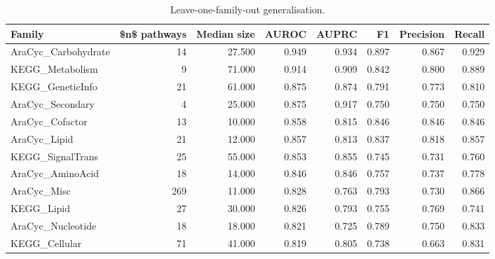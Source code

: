 \begin{table}[htbp]
\centering
\caption{Leave-one-family-out generalisation.}
\label{tab:lofo_recomputed}
\begin{tabular}{lrrrrrrr}
\toprule
Family & \$n\$ pathways & Median size & AUROC & AUPRC & F1 & Precision & Recall \\
\midrule
AraCyc\_Carbohydrate & 14 & 27.500 & 0.949 & 0.934 & 0.897 & 0.867 & 0.929 \\
KEGG\_Metabolism & 9 & 71.000 & 0.914 & 0.909 & 0.842 & 0.800 & 0.889 \\
KEGG\_GeneticInfo & 21 & 61.000 & 0.875 & 0.874 & 0.791 & 0.773 & 0.810 \\
AraCyc\_Secondary & 4 & 25.000 & 0.875 & 0.917 & 0.750 & 0.750 & 0.750 \\
AraCyc\_Cofactor & 13 & 10.000 & 0.858 & 0.815 & 0.846 & 0.846 & 0.846 \\
AraCyc\_Lipid & 21 & 12.000 & 0.857 & 0.813 & 0.837 & 0.818 & 0.857 \\
KEGG\_SignalTrans & 25 & 55.000 & 0.853 & 0.855 & 0.745 & 0.731 & 0.760 \\
AraCyc\_AminoAcid & 18 & 14.000 & 0.846 & 0.846 & 0.757 & 0.737 & 0.778 \\
AraCyc\_Misc & 269 & 11.000 & 0.828 & 0.763 & 0.793 & 0.730 & 0.866 \\
KEGG\_Lipid & 27 & 30.000 & 0.826 & 0.793 & 0.755 & 0.769 & 0.741 \\
AraCyc\_Nucleotide & 18 & 18.000 & 0.821 & 0.725 & 0.789 & 0.750 & 0.833 \\
KEGG\_Cellular & 71 & 41.000 & 0.819 & 0.805 & 0.738 & 0.663 & 0.831 \\
\bottomrule
\end{tabular}

\end{table}

